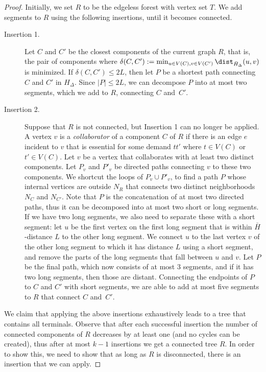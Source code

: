 \begin{proof}
Initially, we set $R$ to be the edgeless forest with vertex set $T$. We add segments to $R$ using the following insertions, until it becomes connected.

\begin{description}
\item[Insertion 1.] Let $C$ and $C'$ be the closest components of the current graph $R$, that is, the pair of components where $\delta(C,C'):=\min_{u\in V(C), v\in V(C')} \dist_{\bar{H}_\Delta} (u,v)$ is minimized. If $\delta(C,C')\leq 2L$, then let $P$ be a shortest path connecting $C$ and $C'$ in $H_\Delta$. Since $|P|\leq 2L$, we can decompose $P$ into at most two segments, which we add to $R$, connecting $C$ and~$C'$.
\item[Insertion 2.]
Suppose that $R$ is not connected, but Insertion 1 can no longer be applied. A vertex $v$ is a \emph{collaborator} of a component $C$ of $R$ if there is an edge $e$ incident to $v$ that is essential for some demand $tt'$ where $t\in V(C)$ or $t'\in V(C)$. 
Let $v$ be a vertex that collaborates with at least two distinct components. Let $P_v$ and $P'_v$ be directed paths connecting $v$ to these two components. We shortcut the loops of $P_v\cup P'_v$, to find a path $P$ whose internal vertices are outside $N_R$ that connects two distinct neighborhoods $N_C$ and $N_{C'}$. Note that $P$ is the concatenation of at most two directed paths, thus it can be decomposed into at most two short or long segments. If we have two long segments, we also need to separate these with a short segment: let $u$ be the first vertex on the first long segment that is within $\bar{H}$-distance $L$ to the other long segment. We connect $u$ to the last vertex $v$ of the other long segment to which it has distance $L$ using a short segment, and remove the parts of the long segments that fall between $u$ and $v$. Let $P$ be the final path, which now consists of at most $3$ segments, and if it has two long segments, then those are distant. Connecting the endpoints of $P$ to $C$ and $C'$ with short segments, we are able to add at most five segments to $R$ that connect $C$ and~$C'$. 
\end{description}

We claim that applying the above insertions exhaustively leads to a tree that contains all terminals. Observe that after each successful insertion the number of connected components of $R$ decreases by at least one (and no cycles can be created), thus after at most $k-1$ insertions we get a connected tree $R$. In order to show this, we need to show that as long as $R$ is disconnected, there is an insertion that we can apply.


\end{proof}
